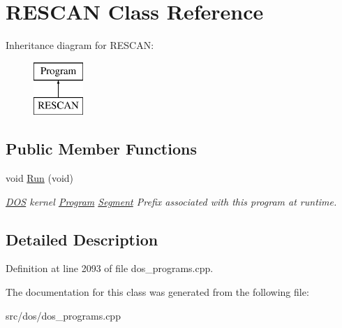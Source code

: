 \hypertarget{classRESCAN}{\section{R\-E\-S\-C\-A\-N Class Reference}
\label{classRESCAN}
}
Inheritance diagram for R\-E\-S\-C\-A\-N\-:\begin{figure}[H]
\begin{center}
\leavevmode
\includegraphics[height=2.000000cm]{classRESCAN}
\end{center}
\end{figure}
\subsection*{Public Member Functions}
\begin{DoxyCompactItemize}
\item 
\hypertarget{classRESCAN_af3bea53bb1105100a4703c239c701df6}{void \hyperlink{classRESCAN_af3bea53bb1105100a4703c239c701df6}{Run} (void)}\label{classRESCAN_af3bea53bb1105100a4703c239c701df6}

\begin{DoxyCompactList}\small\item\em \hyperlink{classDOS}{D\-O\-S} kernel \hyperlink{classProgram}{Program} \hyperlink{structSegment}{Segment} Prefix associated with this program at runtime. \end{DoxyCompactList}\end{DoxyCompactItemize}


\subsection{Detailed Description}


Definition at line 2093 of file dos\-\_\-programs.\-cpp.



The documentation for this class was generated from the following file\-:\begin{DoxyCompactItemize}
\item 
src/dos/dos\-\_\-programs.\-cpp\end{DoxyCompactItemize}
